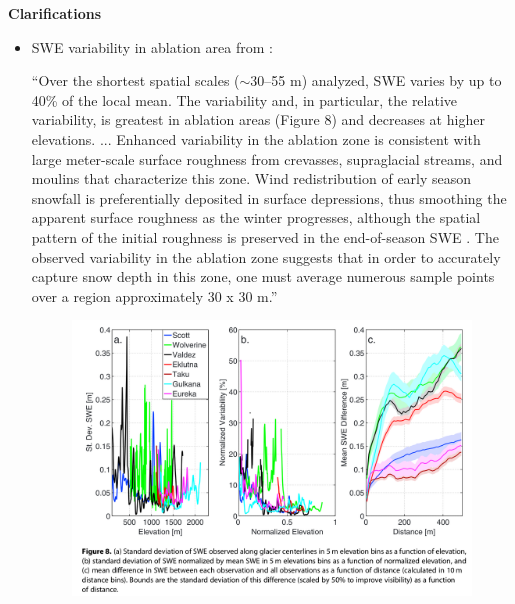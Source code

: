 \documentclass[12pt]{article}
\begin{document}
\pagebreak
\noindent \textbf{Clarifications}
\begin{itemize}
\item SWE variability in ablation area from \cite{McGrath2015}:

``Over the shortest spatial scales ($\sim$30--55 m) analyzed, SWE varies by up to 40\% of the local mean. The variability and, in particular, the relative variability, is greatest in ablation areas (Figure 8) and decreases at higher elevations. ... Enhanced variability in the ablation zone is consistent with large meter-scale surface roughness from crevasses, supraglacial streams, and moulins that characterize this zone. Wind redistribution of early season snowfall is preferentially deposited in surface depressions, thus smoothing the apparent surface roughness as the winter progresses, although the spatial pattern of the initial roughness is preserved in the end-of-season SWE \citep{Schirmer2011}. The observed variability in the ablation zone suggests that in order to accurately capture snow depth in this zone, one must average numerous sample points over a region approximately 30 x 30 m.''

\begin{figure}
\includegraphics[width=\textwidth]{SWEablation.png}
\end{figure}

\end{itemize}
\end{document}
